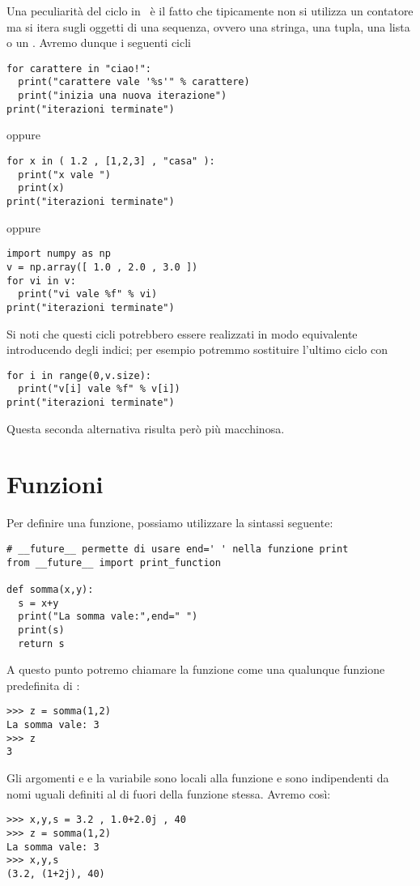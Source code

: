 Una peculiarit\`a del ciclo  in \python\ \`e il fatto che
tipicamente non si utilizza un contatore ma si itera sugli oggetti di
una sequenza, ovvero una stringa, una tupla, una lista o un
. Avremo dunque i seguenti cicli
\begin{verbatim}
for carattere in "ciao!":
  print("carattere vale '%s'" % carattere)
  print("inizia una nuova iterazione")
print("iterazioni terminate")
\end{verbatim}
oppure
\begin{verbatim}
for x in ( 1.2 , [1,2,3] , "casa" ):
  print("x vale ")
  print(x)
print("iterazioni terminate")
\end{verbatim}
oppure
\begin{verbatim}
import numpy as np
v = np.array([ 1.0 , 2.0 , 3.0 ])
for vi in v:
  print("vi vale %f" % vi)
print("iterazioni terminate")
\end{verbatim}
Si noti che questi cicli potrebbero essere realizzati in modo
equivalente introducendo degli indici; per esempio potremmo sostituire
l'ultimo ciclo con
\begin{verbatim}
for i in range(0,v.size):
  print("v[i] vale %f" % v[i])
print("iterazioni terminate")
\end{verbatim}
Questa seconda alternativa risulta per\`o pi\`u macchinosa.

\section{Funzioni}
\label{sec:funzioni}

Per definire una funzione, possiamo utilizzare la sintassi seguente:
\begin{verbatim}
# __future__ permette di usare end=' ' nella funzione print
from __future__ import print_function

def somma(x,y):
  s = x+y
  print("La somma vale:",end=" ")
  print(s)
  return s
\end{verbatim}
A questo punto potremo chiamare la funzione  come una
qualunque funzione predefinita di \python:
\begin{verbatim}
>>> z = somma(1,2)
La somma vale: 3
>>> z
3
\end{verbatim}

Gli argomenti  e  e la variabile  sono locali
alla funzione  e sono indipendenti da nomi uguali definiti
al di fuori della funzione stessa. Avremo cos\`i:
\begin{verbatim}
>>> x,y,s = 3.2 , 1.0+2.0j , 40
>>> z = somma(1,2)
La somma vale: 3
>>> x,y,s
(3.2, (1+2j), 40)
\end{verbatim}

